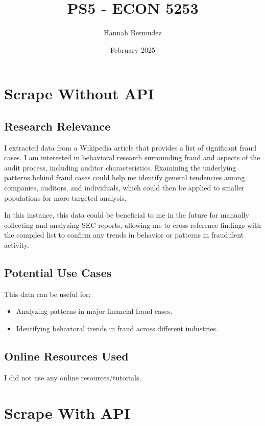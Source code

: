 \documentclass{article}
\title{PS5 - ECON 5253}
\author{Hannah Bermudez}
\date{February 2025}
\begin{document}
\maketitle

\section{Scrape Without API}

\subsection{Research Relevance}
\hspace*{2em} I extracted data from a Wikipedia article that provides a list of significant fraud cases. I am interested in behavioral research surrounding fraud and aspects of the audit process, including auditor characteristics. Examining the underlying patterns behind fraud cases could help me identify general tendencies among companies, auditors, and individuals, which could then be applied to smaller populations for more targeted analysis. 

In this instance, this data could be beneficial to me in the future for manually collecting and analyzing SEC reports, allowing me to cross-reference findings with the compiled list to confirm any trends in behavior or patterns in fraudulent activity.

\subsection{Potential Use Cases}
This data can be useful for:
\begin{itemize}
    \item Analyzing patterns in major financial fraud cases.
    \item Identifying behavioral trends in fraud across different industries.
\end{itemize}

\subsection{Online Resources Used}
I did not use any online resources/tutorials.

\section{Scrape With API}
\end{document}
